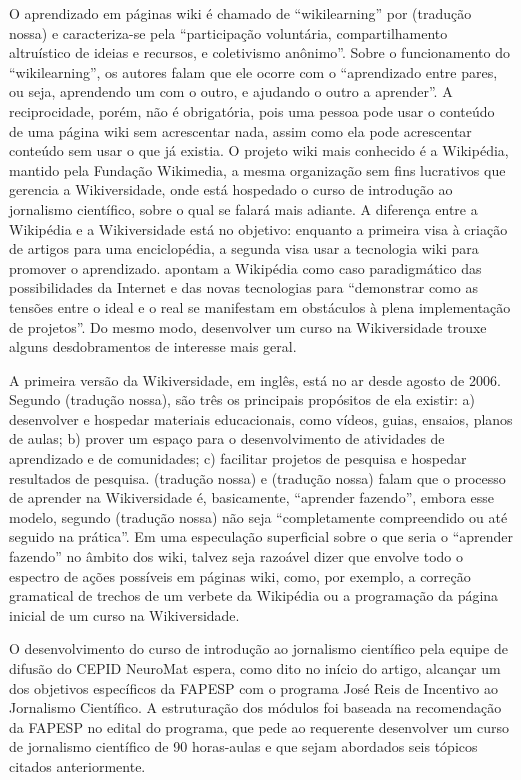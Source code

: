 \documentclass{textolivre}
\begin{document}
O aprendizado em páginas wiki é chamado de “wikilearning” por \textcite[p. 1]{suoranta2015} (tradução nossa) e caracteriza-se pela “participação voluntária, compartilhamento altruístico de ideias e recursos, e coletivismo anônimo”. Sobre o funcionamento do “wikilearning”, os autores falam que ele ocorre com o “aprendizado entre pares, ou seja, aprendendo um com o outro, e ajudando o outro a aprender”. A reciprocidade, porém, não é obrigatória, pois uma pessoa pode usar o conteúdo de uma página wiki sem acrescentar nada, assim como ela pode acrescentar conteúdo sem usar o que já existia. 
O projeto wiki mais conhecido é a Wikipédia, mantido pela Fundação Wikimedia, a mesma organização sem fins lucrativos que gerencia a Wikiversidade, onde está hospedado o curso de introdução ao jornalismo científico, sobre o qual se falará mais adiante. A diferença entre a Wikipédia e a Wikiversidade está no objetivo: enquanto a primeira visa à criação de artigos para uma enciclopédia, a segunda visa usar a tecnologia wiki para promover o aprendizado. \textcite[p. 118]{amiel2015} apontam a Wikipédia como caso paradigmático das possibilidades da Internet e das novas tecnologias para “demonstrar como as tensões entre o ideal e o real se manifestam em obstáculos à plena implementação de projetos”. Do mesmo modo, desenvolver um curso na Wikiversidade trouxe alguns desdobramentos de interesse mais geral.

A primeira versão da Wikiversidade, em inglês, está no ar desde agosto de 2006. Segundo \textcite{lawler2008} (tradução nossa), são três os principais propósitos de ela existir: a) desenvolver e hospedar materiais educacionais, como vídeos, guias, ensaios, planos de aulas; b) prover um espaço para o desenvolvimento de atividades de aprendizado e de comunidades; c) facilitar projetos de pesquisa e hospedar resultados de pesquisa. \textcite{lawler2007} (tradução nossa) e \textcite{lai2009} (tradução nossa) falam que o processo de aprender na Wikiversidade é, basicamente, “aprender fazendo”, embora esse modelo, segundo \textcite{lawler2007} (tradução nossa) não seja “completamente compreendido ou até seguido na prática”. Em uma especulação superficial sobre o que seria o “aprender fazendo” no âmbito dos wiki, talvez seja razoável dizer que envolve todo o espectro de ações possíveis em páginas wiki, como, por exemplo, a correção gramatical de trechos de um verbete da Wikipédia ou a programação da página inicial de um curso na Wikiversidade.

O desenvolvimento do curso de introdução ao jornalismo científico pela equipe de difusão do CEPID NeuroMat espera, como dito no início do artigo, alcançar um dos objetivos específicos da FAPESP com o programa José Reis de Incentivo ao Jornalismo Científico. A estruturação dos módulos foi baseada na recomendação da FAPESP no edital do programa, que pede ao requerente desenvolver um curso de jornalismo científico de 90 horas-aulas e que sejam abordados seis tópicos citados anteriormente.  
\end{document}
